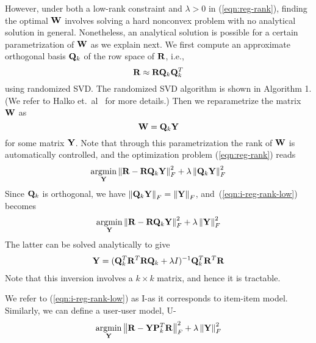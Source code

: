 %



However, under both a low-rank constraint and $\lambda > 0$ in (\ref{eqn:reg-rank}), finding the optimal $\mathbf{W}$ involves solving a hard nonconvex problem with no analytical solution in general. Nonetheless, an analytical solution is possible for a certain parametrization of $\mathbf{W}$ as we explain next. We first compute an approximate orthogonal basis $\mathbf{Q}_k$ of the row space of $\mathbf{R}$, i.e.,
\begin{equation}
\mathbf{R} \approx \mathbf{R} \mathbf{Q}_k \mathbf{Q}_k^T
\end{equation}
using randomized SVD. The randomized SVD algorithm is shown in Algorithm 1. (We refer to Halko et.~al~\citep{halko2011} for more details.)
Then we reparametrize the matrix $\mathbf{W}$ as 
\begin{equation}
\mathbf{W} = \mathbf{Q}_k \mathbf{Y}
\end{equation}
for some matrix $\mathbf{Y}$. Note that through this parametrization the rank of $\mathbf{W}$ is automatically controlled, and the optimization problem (\ref{eqn:reg-rank}) reads
\begin{align}
\label{eqn:i-reg-rank-low}
\underset{\mathbf{Y}} {\mathrm{argmin}}  \left \| \mathbf{R} - \mathbf{R} \mathbf{Q}_k \mathbf{Y} \right \|_F^2 + \lambda \left \|  \mathbf{Q}_k \mathbf{Y} \right \|_F^2 
\end{align}
Since $\mathbf{Q}_k$ is orthogonal, we have $\left \| \mathbf{Q}_k \mathbf{Y} \right \|_F = \left \|\mathbf{Y}\right \|_F$, and~(\ref{eqn:i-reg-rank-low}) becomes 
\begin{align}
\underset{\mathbf{Y}}{\mathrm{argmin}} \left \| \mathbf{R} - \mathbf{R}\mathbf{Q}_k\mathbf{Y}\right \|_F^2 + \lambda \left \|  \mathbf{Y} \right \|_F^2 
\end{align}
The latter can be solved analytically to give 
\begin{align*}
\mathbf{Y} = (\mathbf{Q}_k^T \mathbf{R}^T\mathbf{R}\mathbf{Q}_k +\lambda I)^{-1} \mathbf{Q}_k^T \mathbf{R}^T \mathbf{R}
\end{align*}
Note that this inversion involves a $k \times k$ matrix, and hence it is tractable.

We refer to (\ref{eqn:i-reg-rank-low}) as I-\LinearLow as it corresponds to item-item model. Similarly, we can define a user-user model, U-\LinearLow
\begin{align}
\label{eqn:u-reg-rank-low}
\underset{\mathbf{Y}}{\mathrm{argmin}}  \left \| \mathbf{R} - \mathbf{Y}\mathbf{P}_k^T\mathbf{R}\right \|_F^2 + \lambda \left \|  \mathbf{Y} \right \|_F^2 
\end{align}


